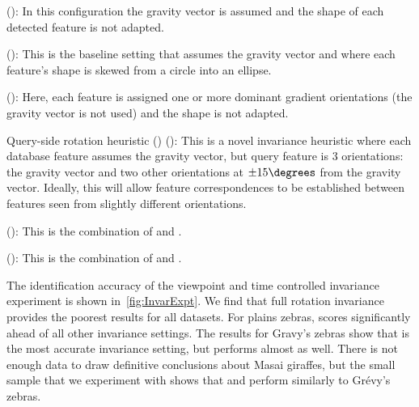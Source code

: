         \begin{itemln}

            \item \NoInvar{} (): %
            In this configuration the gravity vector is assumed and the shape of each detected feature is not
              adapted.

            \item \AIAlone{} (): %
            This is the baseline setting that assumes the gravity vector and where each feature's shape is skewed
              from a circle into an ellipse.

            \item \RIAlone{} (): %
            Here, each feature is assigned one or more dominant gradient orientations (the gravity vector is not
              used) and the shape is not adapted.

            \item Query-side rotation heuristic (\QRHCirc{}) (): %
            This is a novel invariance heuristic where each {database} feature assumes the gravity vector, but
              {query} feature is $3$ orientations:
            the gravity vector and two other orientations at $\pm15\degrees$ from the gravity vector.
            Ideally, this will allow feature correspondences to be established between features seen from
              slightly different orientations.

            \item \QRHEll{} (): %
                This is the combination of \QRHCirc{} and \AIAlone{}.

            \item \AIRI{} (): %
                This is the combination of \RIAlone{} and \AIAlone{}.

        \end{itemln}

        The identification accuracy of the viewpoint and time controlled invariance experiment is shown
          in~\cref{fig:InvarExpt}.
        We find that full rotation invariance provides the poorest results for all datasets.
        For plains zebras, \QRHCirc{} scores significantly ahead of all other invariance settings.
        The results for Gravy's zebras show that \AIAlone{} is the most accurate invariance setting, but
          \QRHEll{} performs almost as well.
        There is not enough data to draw definitive conclusions about Masai giraffes, but the small sample that
          we experiment with shows that \AIAlone{} and \QRHEll{} perform similarly to Grévy's zebras.


